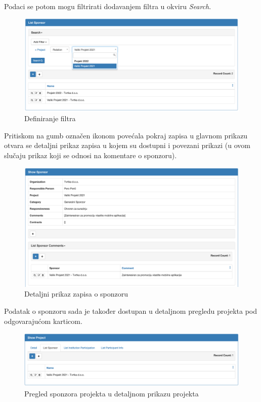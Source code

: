 \documentclass[times, utf8, diplomski]{fer}
\begin{document}
Podaci se potom mogu filtrirati dodavanjem filtra u okviru \emph{Search}.

\begin{figure}[H]
    \centering
    \includegraphics[width=1\textwidth]{slike/sponsorfilter.png}
    \caption{Definiranje filtra}
    \label{fig:sponsorfilter}
\end{figure}

Pritiskom na gumb označen ikonom povećala pokraj zapisa u glavnom prikazu otvara
se detaljni prikaz zapisa u kojem su dostupni i povezani prikazi (u ovom slučaju
prikaz koji se odnosi na komentare o sponzoru).

\begin{figure}[H]
    \centering
    \includegraphics[width=1\textwidth]{slike/detail.png}
    \caption{Detaljni prikaz zapisa o sponzoru}
    \label{fig:detail}
\end{figure}

Podatak o sponzoru sada je također dostupan u detaljnom pregledu projekta pod
odgovarajućom karticom.

\begin{figure}[H]
    \centering
    \includegraphics[width=1\textwidth]{slike/projectsponsor.png}
    \caption{Pregled sponzora projekta u detaljnom prikazu projekta}
    \label{fig:projectsponsor}
\end{figure}
\end{document}
